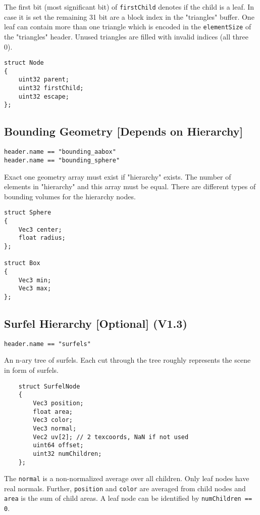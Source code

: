 \documentclass[english,10pt,a4paper,twocolumn,colorscheme=green]{orarticle}
\begin{document}
	The first bit (most significant bit) of \lstinline|firstChild| denotes if the child is a leaf. In case it is set the remaining 31 bit are a block index in the "triangles" buffer. One leaf can contain more than one triangle which is encoded in the \lstinline|elementSize| of the "triangles" header. Unused triangles are filled with invalid indices (all three 0).
	\begin{lstlisting}
struct Node
{
	uint32 parent;
	uint32 firstChild;
	uint32 escape;
};
	\end{lstlisting}
	
	\subsection{Bounding Geometry [Depends on Hierarchy]}
	\lstinline|header.name == "bounding_aabox"|\\
	\lstinline|header.name == "bounding_sphere"|
	
	Exact one geometry array must exist if "hierarchy" exists. The number of elements in "hierarchy" and this array must be equal. There are different types of bounding volumes for the hierarchy nodes.
	\begin{lstlisting}
struct Sphere
{
	Vec3 center;
	float radius;
};

struct Box
{
	Vec3 min;
	Vec3 max;
};
	\end{lstlisting}
	
	
	\subsection{Surfel Hierarchy [Optional] (V1.3)}
	\lstinline|header.name == "surfels"|
	
	An n-ary tree of surfels. Each cut through the tree roughly represents the scene in form of surfels.
\begin{lstlisting}
	struct SurfelNode
	{
		Vec3 position;
		float area;
		Vec3 color;
		Vec3 normal;
		Vec2 uv[2]; // 2 texcoords, NaN if not used
		uint64 offset;
		uint32 numChildren;
	};
\end{lstlisting}
	The \lstinline|normal| is a non-normalized average over all children. Only leaf nodes have real normals. Further, \lstinline|position| and \lstinline|color| are averaged from child nodes and \lstinline|area| is the sum of child areas. A leaf node can be identified by \lstinline|numChildren == 0|.
	
\end{document}
